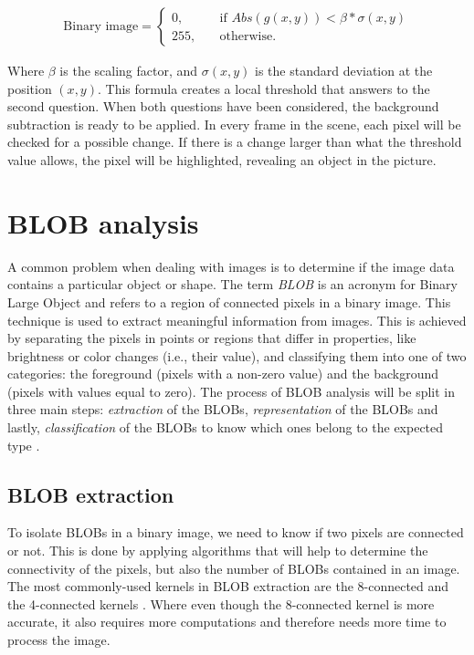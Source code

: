 {\begin{equation}
	\begin{aligned}
  		\ \text{Binary image} = \left\{ \begin{array}{ll}
         0, \quad &\text{if } Abs(g(x,y))<\beta * \sigma(x,y)\\
        255, \quad &\text{otherwise}.
        \end{array} \right . \ 
        \label{localthreshold}  
 	\end{aligned}
\end{equation} 

Where $\beta$ is the scaling factor, and $\sigma(x,y)$ is the standard deviation at the position $(x,y)$. This formula creates a local threshold that answers to the second question. When both questions have been considered, the background subtraction is ready to be applied. In every frame in the scene, each pixel will be checked for a possible change. If there is a change larger than what the threshold value allows, the pixel will be highlighted, revealing an object in the picture.

\section{BLOB analysis}\label{blob}
A common problem when dealing with images is to determine if the image data contains a particular object or shape. The term \textit{BLOB} is an acronym for Binary Large Object and refers to a region of connected pixels in a binary image. This technique is used to extract meaningful information from images. This is achieved by separating the pixels in points or regions that differ in properties, like brightness or color changes (i.e., their value), and classifying them into one of two categories: the foreground (pixels with a non-zero value) and the background (pixels with values equal to zero).
The process of BLOB analysis will be split in three main steps: \textit{extraction} of the BLOBs, \textit{representation} of the BLOBs and lastly, \textit{classification} of the BLOBs to know which ones belong to the expected type \citep{ip_book}.

\subsection{BLOB extraction}
To isolate BLOBs in a binary image, we need to know if two pixels are connected or not. This is done by applying algorithms that will help to determine the connectivity of the pixels, but also the number of BLOBs contained in an image. The most commonly-used kernels in BLOB extraction are the 8-connected and the 4-connected kernels \citep{ip_book}. Where even though the 8-connected kernel is more accurate, it also requires more computations and therefore needs more time to process the image.

}

